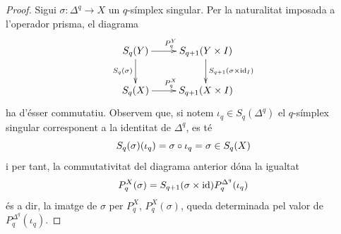 \documentclass[../main.tex]{subfiles}
\begin{document}
\begin{proof}
Sigui $\sigma:\Delta^q\longrightarrow X$ un $q$-símplex singular. Per la naturalitat imposada a l'operador prisma, el diagrama
\begin{equation}
    \notag
    \xymatrix{
    S_q(Y)\ar[r]^{P_q^Y}\ar[d]_{S_q(\sigma)} & S_{q+1}(Y\times I)\ar[d]^{S_{q+1}(\sigma\times \mathrm{id}_I)} \\
    S_q(X)\ar[r]^{P_q^X} & S_{q+1}(X\times I)
    }
\end{equation}
ha d'ésser commutatiu. Observem que, si notem $\iota_q\in S_q(\Delta^q)$ el $q$-símplex singular corresponent a la identitat de $\Delta^q$, es té
\begin{equation}
    \notag
    S_q(\sigma)(\iota_q) = \sigma\circ\iota_q = \sigma\in S_q(X)
\end{equation}
i per tant, la commutativitat del diagrama anterior dóna la igualtat
\begin{equation}
    \notag
    P_q^X(\sigma) = S_{q+1}(\sigma\times\mathrm{id})P_q^{\Delta^q}(\iota_q)
\end{equation}
és a dir, la imatge de $\sigma$ per $P_q^X$, $P_q^X(\sigma)$, queda determinada pel valor de $P_q^{\Delta^q}(\iota_q)$.


\end{proof}
\end{document}
